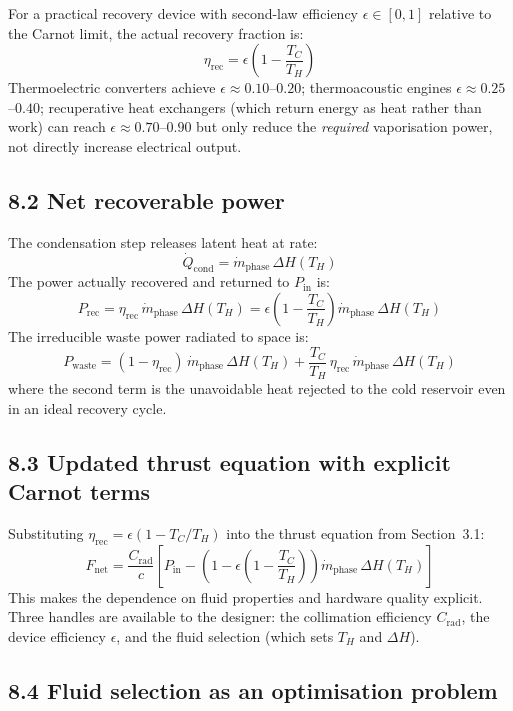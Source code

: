 \documentclass[12pt]{article}
\begin{document}
For a practical recovery device with second-law efficiency $\epsilon \in [0,1]$
relative to the Carnot limit, the actual recovery fraction is:
\[
  \eta_{\mathrm{rec}} = \epsilon \left(1 - \frac{T_C}{T_H}\right)
\]
Thermoelectric converters achieve $\epsilon \approx 0.10$--$0.20$; thermoacoustic
engines $\epsilon \approx 0.25$--$0.40$; recuperative heat exchangers (which
return energy as heat rather than work) can reach $\epsilon \approx 0.70$--$0.90$
but only reduce the \emph{required} vaporisation power, not directly increase
electrical output.

\subsection*{8.2 Net recoverable power}

The condensation step releases latent heat at rate:
\[
  \dot{Q}_{\mathrm{cond}} = \dot{m}_{\mathrm{phase}}\,\Delta H(T_H)
\]
The power actually recovered and returned to $P_{\mathrm{in}}$ is:
\[
  P_{\mathrm{rec}} = \eta_{\mathrm{rec}}\,\dot{m}_{\mathrm{phase}}\,\Delta H(T_H)
  = \epsilon\!\left(1 - \frac{T_C}{T_H}\right)\dot{m}_{\mathrm{phase}}\,\Delta H(T_H)
\]
The irreducible waste power radiated to space is:
\[
  P_{\mathrm{waste}} = (1 - \eta_{\mathrm{rec}})\,\dot{m}_{\mathrm{phase}}\,\Delta H(T_H)
  + \frac{T_C}{T_H}\,\eta_{\mathrm{rec}}\,\dot{m}_{\mathrm{phase}}\,\Delta H(T_H)
\]
where the second term is the unavoidable heat rejected to the cold reservoir
even in an ideal recovery cycle.

\subsection*{8.3 Updated thrust equation with explicit Carnot terms}

Substituting $\eta_{\mathrm{rec}} = \epsilon(1 - T_C/T_H)$ into the thrust
equation from Section~3.1:
\[
  \boxed{
  F_{\mathrm{net}} = \frac{C_{\mathrm{rad}}}{c}
  \left[
    P_{\mathrm{in}}
    - \left(1 - \epsilon\!\left(1 - \frac{T_C}{T_H}\right)\right)
      \dot{m}_{\mathrm{phase}}\,\Delta H(T_H)
  \right]
  }
\]
This makes the dependence on fluid properties and hardware quality explicit.
Three handles are available to the designer: the collimation efficiency
$C_{\mathrm{rad}}$, the device efficiency $\epsilon$, and the fluid selection
(which sets $T_H$ and $\Delta H$).

\subsection*{8.4 Fluid selection as an optimisation problem}
\end{document}
